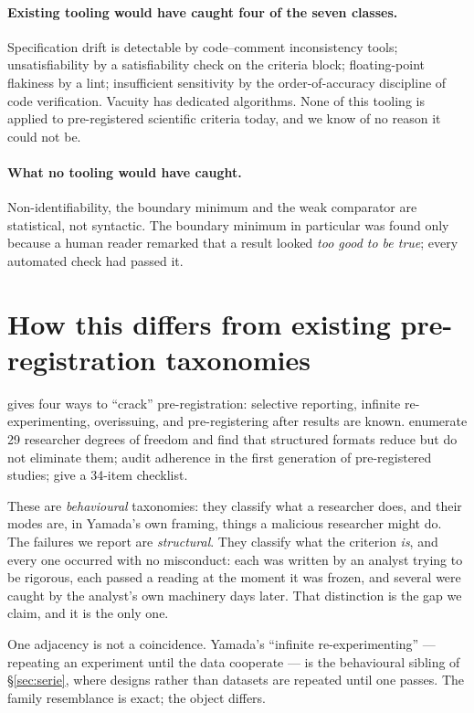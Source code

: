 \documentclass[11pt,a4paper]{article}
\begin{document}
\paragraph{Existing tooling would have caught four of the seven classes.} Specification drift
is detectable by code--comment inconsistency tools; unsatisfiability by a satisfiability check
on the criteria block; floating-point flakiness by a lint; insufficient sensitivity by the
order-of-accuracy discipline of code verification. Vacuity has dedicated algorithms. None of
this tooling is applied to pre-registered scientific criteria today, and we know of no reason
it could not be.

\paragraph{What no tooling would have caught.} Non-identifiability, the boundary minimum and
the weak comparator are statistical, not syntactic. The boundary minimum in particular was
found only because a human reader remarked that a result looked \emph{too good to be true};
every automated check had passed it.

\section{How this differs from existing pre-registration taxonomies}
\label{sec:yamada}

\citet{yamada2018} gives four ways to ``crack'' pre-registration: selective reporting,
infinite re-experimenting, overissuing, and pre-registering after results are known.
\citet{bakker2020} enumerate 29 researcher degrees of freedom and find that structured
formats reduce but do not eliminate them; \citet{claesen2021} audit adherence in the first
generation of pre-registered studies; \citet{wicherts2016} give a 34-item checklist.

These are \emph{behavioural} taxonomies: they classify what a researcher does, and their
modes are, in Yamada's own framing, things a malicious researcher might do. The failures we
report are \emph{structural}. They classify what the criterion \emph{is}, and every one
occurred with no misconduct: each was written by an analyst trying to be rigorous, each
passed a reading at the moment it was frozen, and several were caught by the analyst's own
machinery days later. That distinction is the gap we claim, and it is the only one.

One adjacency is not a coincidence. Yamada's ``infinite re-experimenting'' --- repeating an
experiment until the data cooperate --- is the behavioural sibling of \S\ref{sec:serie},
where designs rather than datasets are repeated until one passes. The family resemblance is
exact; the object differs.
\end{document}

